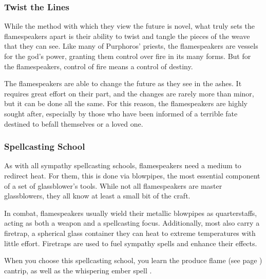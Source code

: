     \subsubsection{Twist the Lines}
        While the method with which they view the future is novel, what truly sets the flamespeakers apart is their ability to twist and tangle the pieces of the weave that they can see.
        Like many of Purphoros' priests, the flamespeakers are vessels for the god's power, granting them control over fire in its many forms.
        But for the flamespeakers, control of fire means a control of destiny.

        The flamespeakers are able to change the future as they see in the ashes.
        It requires great effort on their part, and the changes are rarely more than minor, but it can be done all the same.
        For this reason, the flamespeakers are highly sought after, especially by those who have been informed of a terrible fate destined to befall themselves or a loved one.

    \subsubsection{Spellcasting School}
        As with all sympathy spellcasting schools, flamespeakers need a medium to redirect heat.
        For them, this is done via blowpipes, the most essential component of a set of glassblower's tools.
        While not all flamespeakers are master glassblowers, they all know at least a small bit of the craft.

        In combat, flamespeakers usually wield their metallic blowpipes as quarterstaffs, acting as both a weapon and a spellcasting focus.
        Additionally, most also carry a firetrap, a spherical glass container they can heat to extreme temperatures with little effort. %
        Firetraps are used to fuel sympathy spells and enhance their effects.

        When you choose this spellcasting school, you learn the produce flame (see page \pageref{spell::produceflame}) cantrip, as well as the whispering ember spell \pageref{spell::whisperingember}.
